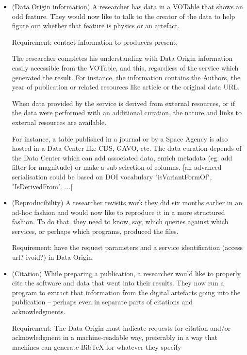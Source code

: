 \documentclass[11pt,a4paper]{ivoa}
\begin{document}
\begin{itemize}
	\item (Data Origin information) A researcher has data in a VOTable that shows an odd feature. They would now like to talk to the creator of the data to help figure out whether that feature is physics or an artefact. 
	
	Requirement: contact information to producers present.
	
	The researcher completes his understanding with Data Origin information easily accessible from the VOTable, and this, regardless of the service which generated the result. For instance, the information contains the Authors, the year of publication or related resources like article or the original data URL.
		
	When data provided by the service is derived from external resources, or if the data were performed with an additional curation, the nature and links to external resources are available.
	
	For instance, a table published in a journal or by a Space Agency is also hosted in a Data Center like CDS, GAVO, etc. The data curation depends of the Data Center which can add associated data, enrich metadata (eg: add filter for magnitude) or make a sub-selection of columns. [an advanced serialisation could be based on DOI vocabulary "isVariantFormOf", "IsDerivedFrom", ...]
	
	\item (Reproducibility) A researcher revisits work they did six months earlier in an ad-hoc fashion and would now like to reproduce it in a more structured fashion. To do that, they need to know, say, which queries against which services, or perhaps which programs, produced the files. 
	
	Requirement: have the request parameters and a service identification (access url? ivoid?) in Data Origin.
	
	\item (Citation) While preparing a publication, a researcher would like to properly cite the software and data that went into their results. They now run a program to extract that information from the digital artefacts going into the publication -- perhaps even in separate parts of citations and acknowledgments. 
	
	Requirement: The Data Origin must indicate requests for citation and/or acknowledgment in a machine-readable way, preferably in a way that machines can generate BibTeX for whatever they specify
	

\end{itemize}
\end{document}
